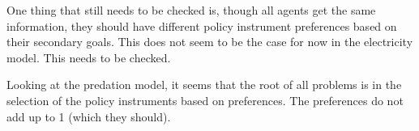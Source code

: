 One thing that still needs to be checked is, though all agents get the same information, they should have different policy instrument preferences based on their secondary goals. This does not seem to be the case for now in the electricity model. This needs to be checked.

Looking at the predation model, it seems that the root of all problems is in the selection of the policy instruments based on preferences. The preferences do not add up to 1 (which they should).

